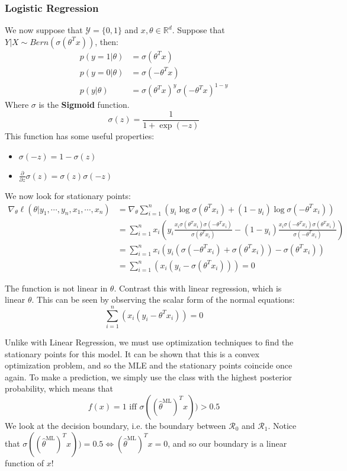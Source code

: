 \documentclass[]{article}
\theoremstyle{mattstyle}
\theoremstyle{definition}
\begin{document}
\subsubsection{Logistic Regression}

We now suppose that $\mathcal{Y} = \{0,1\}$ and $x,\theta \in \mathbb{R}^d$. Suppose that $Y|X \sim Bern(\sigma(\theta^Tx))$, then:
\begin{align*}
p(y=1|\theta) &= \sigma(\theta^Tx)\\
p(y=0|\theta) &= \sigma(-\theta^Tx)\\
p(y|\theta) &= \sigma(\theta^Tx)^y\sigma(-\theta^Tx)^{1-y}
\end{align*}
Where $\sigma$ is the \textbf{Sigmoid} function. 
$$\sigma(z) = \frac{1}{1+\exp(-z)}$$
This function has some useful properties:
\begin{itemize}
	\item $\sigma(-z) = 1-\sigma(z)$
	\item $ \frac{\partial}{\partial z}\sigma(z) = \sigma(z)\sigma(-z)$
\end{itemize}
We now look for stationary points:
\begin{align*}
\nabla_{\theta} \ell(\theta |y_1, \cdots, y_n, x_1, \cdots, x_n) &= \nabla_{\theta}\sum_{i=1}^n\left(y_i \log \sigma(\theta^Tx_i) + (1-y_i)\log \sigma(-\theta^Tx_i) \right)\\
&= \sum_{i=1}^n x_i\left( y_i \frac{x_i\sigma(\theta^Tx_i)\sigma(-\theta^Tx_i)}{\sigma(\theta^Tx_i)} -(1-y_i) \frac{x_i\sigma(-\theta^Tx_i)\sigma(\theta^Tx_i)}{\sigma(-\theta^Tx_i)}\right)\\
&=\sum_{i=1}^n x_i\left( y_i\left(\sigma(-\theta^Tx_i) + \sigma(\theta^Tx_i)\right) - \sigma(\theta^Tx_i) \right)\\
&=\sum_{i=1}^n\left( x_i(y_i - \sigma(\theta^Tx_i)) \right)=0
\end{align*}

The function is not linear in $\theta$. Contrast this with linear regression, which is linear $\theta$. This can be seen by observing the scalar form of the normal equations:
$$\sum_{i=1}^n\left( x_i(y_i - \theta^Tx_i) \right)=0$$

Unlike with Linear Regression, we must use optimization techniques to find the stationary points for this model. It can be shown that this is a convex optimization problem, and so the MLE and the stationary points coincide once again. To make a prediction, we simply use the class with the highest posterior probability, which means that
$$f(x)=1 \text{ iff } \sigma((\hat{\theta}^{\text{ML}})^Tx))>0.5 $$
We look at the decision boundary, i.e. the boundary between $\mathcal{R}_0$ and $\mathcal{R}_1$. Notice that $\sigma((\hat{\theta}^{\text{ML}})^Tx))=0.5 \iff (\hat{\theta}^{\text{ML}})^Tx = 0$, and so our boundary is a linear function of $x$!
\newpage
\end{document}
